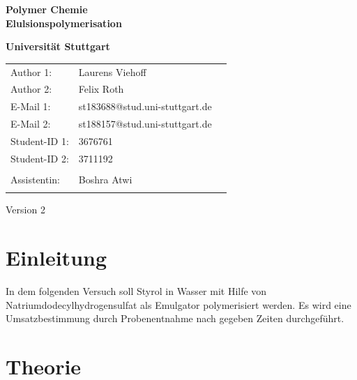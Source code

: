 \documentclass[10pt,a4paper,ngerman]{scrartcl}
\begin{document}
\begin{titlepage}
	\vspace*{2,5cm}
	\begin{center}
		\begin{LARGE}
			\textbf{Polymer Chemie}\\
			\textbf{Elulsionspolymerisation}\\
		\end{LARGE}
		\vspace{1cm}
		\textbf{Universität Stuttgart}\\
		\vspace*{1,5cm}
		\begin{tabular}{lp{}l}
			Author 1:     &Laurens Viehoff\\
            Author 2:     &Felix Roth\\   
			E-Mail 1:      &st183688@stud.uni-stuttgart.de\\
            E-Mail 2:      &st188157@stud.uni-stuttgart.de  \\
			Student-ID 1: & 3676761   \\ 
            Student-ID 2: & 3711192 \\ \\
			Assistentin:  & Boshra Atwi  \\ \\ 
		\end{tabular}
		
		\vspace{2cm}
		Version 2\\
	\end{center}

    
\end{titlepage}
\thispagestyle{empty}
\renewcommand{\thepage}{\arabic{page}}
\newpage
\tableofcontents
\setcounter{page}{1}
\renewcommand{\thepage}{\arabic{page}}
\newpage


\section{Einleitung}

	In dem folgenden Versuch soll Styrol in Wasser mit Hilfe von Natriumdodecylhydrogensulfat als Emulgator polymerisiert werden.
	Es wird eine Umsatzbestimmung durch Probenentnahme nach gegeben Zeiten durchgeführt. 

\section{Theorie}
\end{document}
